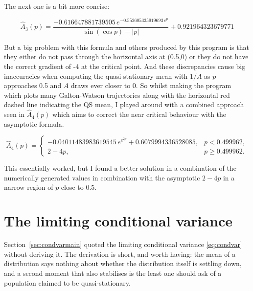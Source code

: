 \documentclass[11pt]{article}
\begin{document}
\noindent
The next one is a bit more concise:

\[
\hat A_3(p)  = \frac{-0.616647881739505 \, e^{-0.552605335919693 \, e^p}}{\sin(\cos p) - |p|} + 0.921964323679771
\]

\noindent
But a big problem with this formula and others produced by this program is that they either do not pass through the horizontal axis at (0.5,0) or they do not have the correct gradient of -4 at the critical point. And these discrepancies cause big inaccuracies when computing the quasi-stationary mean with $1/A$ as $p$ approaches 0.5 and $A$ draws ever closer to 0. So whilst making the program which plots many Galton-Watson trajectories along with the horizontal red dashed line indicating the QS mean, I played around with a combined approach seen in $\hat A_4(p)$ which aims to correct the near critical behaviour with the asymptotic formula. 


\[
\hat A_4(p) = 
\begin{cases}
-0.04011483983619545\, e^{e^{2p}} + 0.6079994336528085, & p < 0.499962,\\[2mm]
2 - 4p, & p \ge 0.499962.
\end{cases}
\]


\noindent
This essentially worked, but I found a better solution in a combination of the numerically generated values in combination with the asymptotic $2-4p$ in a narrow region of $p$ close to 0.5.



\section{The limiting conditional variance}
\label{app:condvar}

Section~\ref{sec:condvarmain} quoted the limiting conditional variance \eqref{eq:condvar} without deriving it. The derivation is short, and worth having: the mean of a distribution says nothing about whether the distribution itself is settling down, and a second moment that also stabilises is the least one should ask of a population claimed to be quasi-stationary.
\end{document}
